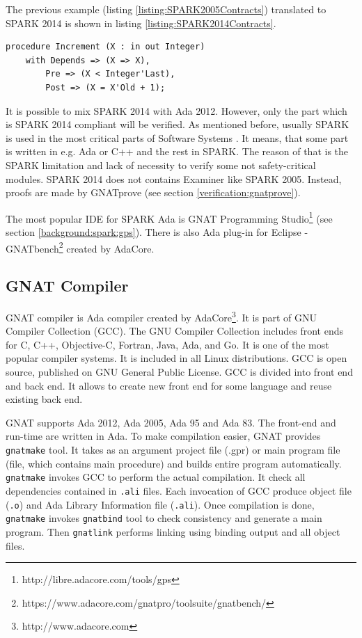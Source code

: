 The previous example (listing \ref{listing:SPARK2005Contracts}) translated to SPARK 2014 is shown in listing \ref{listing:SPARK2014Contracts}.

\singlespacing
\begin{lstlisting}[language=ada2012, frame=single, gobble=0, caption={Sample SPARK 2014 procedure and Code Contracts}, label={listing:SPARK2014Contracts}]
	procedure Increment (X : in out Integer)
	with Depends => (X => X),
		Pre => (X < Integer'Last),
		Post => (X = X'Old + 1);
\end{lstlisting}
\doublespacing

It is possible to mix SPARK 2014 with Ada 2012. However, only the part which is SPARK 2014 compliant will be verified. As mentioned before, usually SPARK is used in the most critical parts of Software Systems \cite{Spark:IndustrialExp}. It means, that some part is written in e.g. Ada or C++ and the rest in SPARK. The reason of that is the SPARK limitation and lack of necessity to verify some not safety-critical modules. SPARK 2014 does not contains Examiner like SPARK 2005. Instead, proofs are made by GNATprove (see section \ref{verification:gnatprove}).

The most popular IDE for SPARK Ada is GNAT Programming Studio\footnote{http://libre.adacore.com/tools/gps} (see section \ref{background:spark:gps}). There is also Ada plug-in for Eclipse - GNATbench\footnote{https://www.adacore.com/gnatpro/toolsuite/gnatbench/} created by AdaCore. 



\subsection{GNAT Compiler}
\label{background:spark:gnat}

GNAT compiler is Ada compiler created by AdaCore\footnote{http://www.adacore.com}. It is part of GNU Compiler Collection (GCC). The GNU Compiler Collection includes front ends for C, C++, Objective-C, Fortran, Java, Ada, and Go. It is one of the most popular compiler systems. It is included in all Linux distributions. GCC is open source, published on GNU General Public License. GCC is divided into front end and back end. It allows to create new front end for some language and reuse existing back end.

GNAT supports Ada 2012, Ada 2005, Ada 95 and Ada 83. The front-end and run-time are written in Ada. To make compilation easier, GNAT provides \lstinline{gnatmake} tool. It takes as an argument project file (.gpr) or main program file (file, which contains main procedure) and builds entire program automatically. \lstinline{gnatmake} invokes GCC to perform the actual compilation. It check all dependencies contained in \lstinline{.ali} files. Each invocation of GCC produce object file (\lstinline{.o}) and Ada Library Information file (\lstinline{.ali}). Once compilation is done, \lstinline{gnatmake} invokes \lstinline{gnatbind} tool to check consistency and generate a main program. Then \lstinline{gnatlink} performs linking using binding output and all object files.

